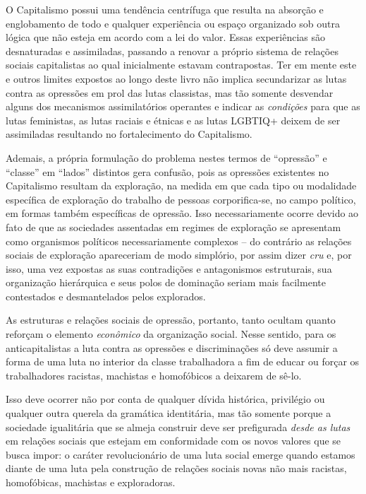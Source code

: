 O Capitalismo possui uma tendência centrífuga que resulta na absorção e
englobamento de todo e qualquer experiência ou espaço organizado sob
outra lógica que não esteja em acordo com a lei do valor. Essas
experiências são desnaturadas e assimiladas, passando a renovar a
próprio sistema de relações sociais capitalistas ao qual inicialmente
estavam contrapostas. Ter em mente este e outros limites expostos ao
longo deste livro não implica secundarizar as lutas contra as opressões
em prol das lutas classistas, mas tão somente desvendar alguns dos
mecanismos assimilatórios operantes e indicar as \emph{condições} para
que as lutas feministas, as lutas raciais e étnicas e as lutas LGBTIQ+
deixem de ser assimiladas resultando no fortalecimento do Capitalismo.

Ademais, a própria formulação do problema nestes termos de ``opressão''
e ``classe'' em ``lados'' distintos gera confusão, pois as opressões
existentes no Capitalismo resultam da exploração, na medida em que cada
tipo ou modalidade específica de exploração do trabalho de pessoas
corporifica-se, no campo político, em formas também específicas de
opressão. Isso necessariamente ocorre devido ao fato de que as
sociedades assentadas em regimes de exploração se apresentam como
organismos políticos necessariamente complexos -- do contrário as
relações sociais de exploração apareceriam de modo simplório, por assim
dizer \emph{cru} e, por isso, uma vez expostas as suas contradições e
antagonismos estruturais, sua organização hierárquica e seus polos de
dominação seriam mais facilmente contestados e desmantelados pelos
explorados.

As estruturas e relações sociais de opressão, portanto, tanto ocultam
quanto reforçam o elemento \emph{econômico} da organização social. Nesse
sentido, para os anticapitalistas a luta contra as opressões e
discriminações só deve assumir a forma de uma luta no interior da classe
trabalhadora a fim de educar ou forçar os trabalhadores racistas,
machistas e homofóbicos a deixarem de sê-lo.

Isso deve ocorrer não por conta de qualquer dívida histórica, privilégio
ou qualquer outra querela da gramática identitária, mas tão somente
porque a sociedade igualitária que se almeja construir deve ser
prefigurada \emph{desde as lutas} em relações sociais que estejam em
conformidade com os novos valores que se busca impor: o caráter
revolucionário de uma luta social emerge quando estamos diante de uma
luta pela construção de relações sociais novas não mais racistas,
homofóbicas, machistas e exploradoras.

